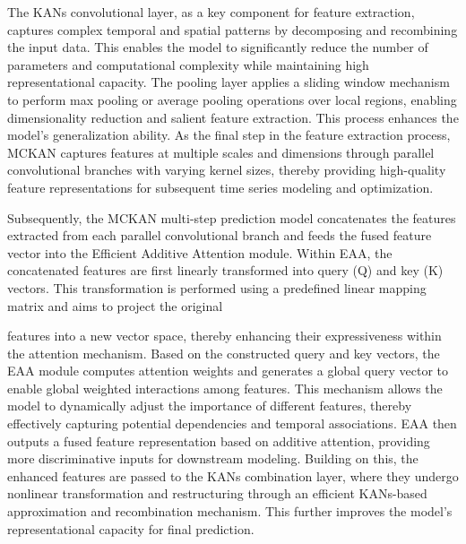 \documentclass[
  10
]{article}
\begin{document}
The KANs convolutional layer, as a key component for feature extraction,
captures complex temporal and spatial patterns by decomposing and
recombining the input data. This enables the model to significantly
reduce the number of parameters and computational complexity while
maintaining high representational capacity. The pooling layer applies a
sliding window mechanism to perform max pooling or average pooling
operations over local regions, enabling dimensionality reduction and
salient feature extraction. This process enhances the model's
generalization ability. As the final step in the feature extraction
process, MCKAN captures features at multiple scales and dimensions
through parallel convolutional branches with varying kernel sizes,
thereby providing high-quality feature representations for subsequent
time series modeling and optimization.

Subsequently, the MCKAN multi-step prediction model concatenates the
features extracted from each parallel convolutional branch and feeds the
fused feature vector into the Efficient Additive Attention module.
Within EAA, the concatenated features are first linearly transformed
into query (Q) and key (K) vectors. This transformation is performed
using a predefined linear mapping matrix and aims to project the
original

features into a new vector space, thereby enhancing their expressiveness
within the attention mechanism. Based on the constructed query and key
vectors, the EAA module computes attention weights and generates a
global query vector to enable global weighted interactions among
features. This mechanism allows the model to dynamically adjust the
importance of different features, thereby effectively capturing
potential dependencies and temporal associations. EAA then outputs a
fused feature representation based on additive attention, providing more
discriminative inputs for downstream modeling. Building on this, the
enhanced features are passed to the KANs combination layer, where they
undergo nonlinear transformation and restructuring through an efficient
KANs-based approximation and recombination mechanism. This further
improves the model's representational capacity for final prediction.
\end{document}
